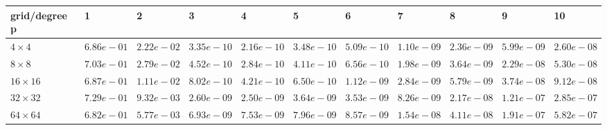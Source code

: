 \begin{tabular}{lllllllllll}
\hline
 grid/degree p   & 1          & 2          & 3          & 4          & 5          & 6          & 7          & 8          & 9          & 10         \\
\hline
 $4 \times 4$    & $6.86e-01$ & $2.22e-02$ & $3.35e-10$ & $2.16e-10$ & $3.48e-10$ & $5.09e-10$ & $1.10e-09$ & $2.36e-09$ & $5.99e-09$ & $2.60e-08$ \\
 $8 \times 8$    & $7.03e-01$ & $2.79e-02$ & $4.52e-10$ & $2.84e-10$ & $4.11e-10$ & $6.56e-10$ & $1.98e-09$ & $3.64e-09$ & $2.29e-08$ & $5.30e-08$ \\
 $16 \times 16$  & $6.87e-01$ & $1.11e-02$ & $8.02e-10$ & $4.21e-10$ & $6.50e-10$ & $1.12e-09$ & $2.84e-09$ & $5.79e-09$ & $3.74e-08$ & $9.12e-08$ \\
 $32 \times 32$  & $7.29e-01$ & $9.32e-03$ & $2.60e-09$ & $2.50e-09$ & $3.64e-09$ & $3.53e-09$ & $8.26e-09$ & $2.17e-08$ & $1.21e-07$ & $2.85e-07$ \\
 $64 \times 64$  & $6.82e-01$ & $5.77e-03$ & $6.93e-09$ & $7.53e-09$ & $7.96e-09$ & $8.57e-09$ & $1.54e-08$ & $4.11e-08$ & $1.91e-07$ & $5.82e-07$ \\
\hline
\end{tabular}